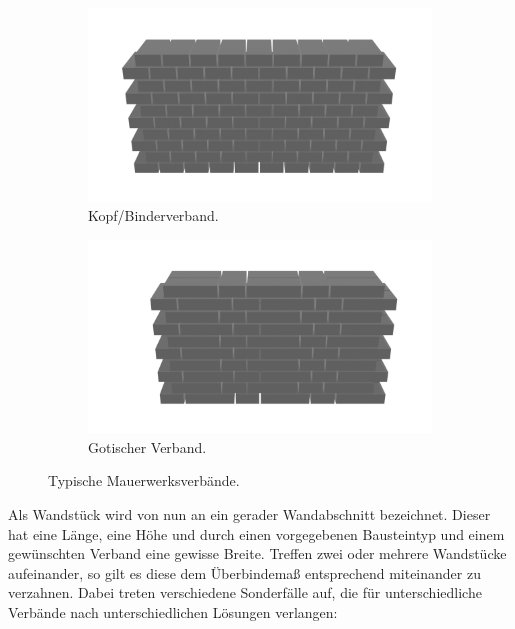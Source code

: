 \begin{figure}[htb]
  \begin{subfigure}[b]{0.5\columnwidth}
    \includegraphics[width=\columnwidth]{fig/kopfverband.png}
    \caption{Kopf/Binderverband.}\label{fig:basics:binderverband}
  \end{subfigure}
  \begin{subfigure}[b]{0.5\columnwidth}
    \includegraphics[width=\columnwidth]{fig/gotischerverband.png}
    \caption{Gotischer Verband.}\label{fig:basics:gotischer_verband}
  \end{subfigure}
  \caption{Typische Mauerwerksverbände.}\label{fig:basics:verbaende}
\end{figure}
Als Wandstück wird von nun an ein gerader Wandabschnitt bezeichnet.
Dieser hat eine Länge, eine Höhe und durch einen vorgegebenen Bausteintyp und einem gewünschten Verband eine gewisse Breite.
Treffen zwei oder mehrere Wandstücke aufeinander, so gilt es diese dem Überbindemaß entsprechend miteinander zu verzahnen.
Dabei treten verschiedene Sonderfälle auf, die für unterschiedliche Verbände nach unterschiedlichen Lösungen verlangen:
